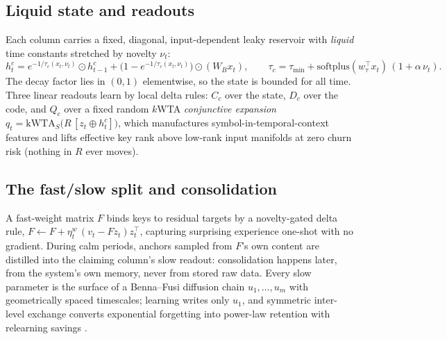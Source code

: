 \documentclass[11pt]{article}
\begin{document}
\subsection{Liquid state and readouts}
Each column carries a fixed, diagonal, input-dependent leaky reservoir with
\emph{liquid} time constants stretched by novelty $\nu_t$:
\begin{equation}
h^c_t = e^{-1/\tau_c(x_t,\nu_t)} \odot h^c_{t-1} +
\big(1 - e^{-1/\tau_c(x_t,\nu_t)}\big) \odot (W_B x_t),
\qquad \tau_c = \tau_{\min} + \mathrm{softplus}(w_\tau^{\!\top} x_t)
\,(1 + \alpha\,\nu_t).
\end{equation}
The decay factor lies in $(0,1)$ elementwise, so the state is bounded for
all time. Three linear readouts learn by local delta rules: $C_c$ over the
state, $D_c$ over the code, and $Q_c$ over a fixed random $k$WTA
\emph{conjunctive expansion} $q_t = \mathrm{kWTA}_S\!\big(R\,[z_t \oplus
h^c_t]\big)$, which manufactures symbol-in-temporal-context features and
lifts effective key rank above low-rank input manifolds at zero churn risk
(nothing in $R$ ever moves).

\subsection{The fast/slow split and consolidation}
A fast-weight matrix $F$ binds keys to residual targets by a
novelty-gated delta rule, $F \leftarrow F + \eta^w_t\,(v_t - F z_t)
z_t^{\!\top}$, capturing surprising experience one-shot with no gradient.
During calm periods, anchors sampled from $F$'s own content are distilled
into the claiming column's slow readout: consolidation happens later, from
the system's own memory, never from stored raw data. Every slow parameter
is the surface of a Benna--Fusi diffusion chain $u_1,\dots,u_m$ with
geometrically spaced timescales; learning writes only $u_1$, and symmetric
inter-level exchange converts exponential forgetting into power-law
retention with relearning savings \cite{benna2016,fusi2005}.
\end{document}
